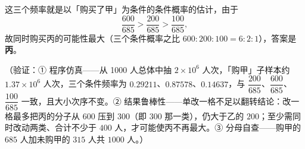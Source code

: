 \begin{answer}
这三个频率就是以「购买了甲」为条件的条件概率的估计，由于
\nopagebreak[4]
\[
\frac{600}{685}>\frac{200}{685}>\frac{100}{685},
\]
故同时购买丙的可能性最大（三个条件概率之比 \(600:200:100=6:2:1\)），答案是\textbf{丙}。

（验证：① 程序仿真——从 1000 人总体中抽 \(2\times10^{6}\) 人次，「购甲」子样本约 \(1.37\times10^{6}\) 人次，三个条件频率为 \(0.29211\)、\(0.87578\)、\(0.14637\)，与 \(\dfrac{200}{685}\)、\(\dfrac{600}{685}\)、\(\dfrac{100}{685}\) 一致，且大小次序不变。② 结果鲁棒性——单改一格不足以翻转结论：改一格最多把丙的分子从 \(600\) 压到 \(300\)（即 300 那一类），仍大于乙的 \(200\)；至少需同时改动两类、合计不少于 \(400\) 人，才可能使丙不再最大。③ 分母自查——购甲的 \(685\) 人加未购甲的 \(315\) 人共 \(1000\) 人。）




\end{answer}
